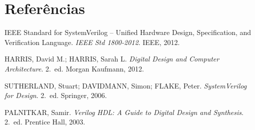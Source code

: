 \documentclass[12pt,a4paper]{article}
\begin{document}
\section*{Referências}

\begin{enumerate}[leftmargin=1.5cm, label={[\arabic*]}]
  \item IEEE Standard for SystemVerilog -- Unified Hardware Design, Specification,
        and Verification Language. \textit{IEEE Std 1800-2012}. IEEE, 2012.
  \item HARRIS, David M.; HARRIS, Sarah L. \textit{Digital Design and Computer
        Architecture}. 2.\ ed. Morgan Kaufmann, 2012.
  \item SUTHERLAND, Stuart; DAVIDMANN, Simon; FLAKE, Peter. \textit{SystemVerilog
        for Design}. 2.\ ed. Springer, 2006.
  \item PALNITKAR, Samir. \textit{Verilog HDL: A Guide to Digital Design and
        Synthesis}. 2.\ ed. Prentice Hall, 2003.
\end{enumerate}
\end{document}
